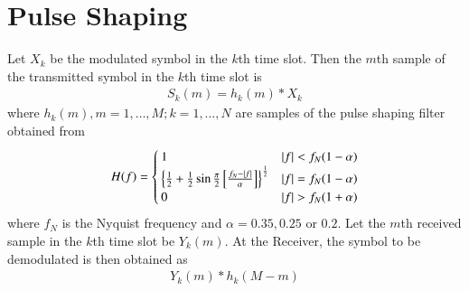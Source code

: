 \documentclass[journal,12pt,twocolumn]{IEEEtran}
\begin{document}
\section{Pulse Shaping}
Let $X_k$ be the modulated symbol in the $k$th time slot.  Then the $m$th sample of the transmitted symbol in the $k$th time slot is
\begin{align}
S_k(m)=h_k(m)* X_k
\end{align}
where $h_k(m), m=1,\dots, M; k=1,\dots,N$ are samples of the pulse shaping filter \cite{dvb}  obtained from
\begin{align}
H(f) =\begin{cases}
1& \left\vert f\right\vert<f_N(1-\alpha)\\
\left\{\frac{1}{2}+\frac{1}{2}\sin \frac{\pi}{2}{}\left[\frac{f_N-\left\vert f\right\vert}{\alpha}\right]\right\}^{\frac{1}{2}}&\left\vert f\right\vert=f_N(1-\alpha)\\
0&\left\vert f\right\vert>f_N(1+\alpha)
\end{cases}
\end{align}
%
where $f_N$ is the Nyquist frequency and $\alpha = 0.35, 0.25$ or $0.2$.
Let the $m$th received sample in the  $k$th time slot be $Y_k(m)$. At the Receiver, the symbol to be demodulated is then obtained as
\begin{align}
Y_k(m)*h_k(M-m)
\end{align}




%


\end{document}
